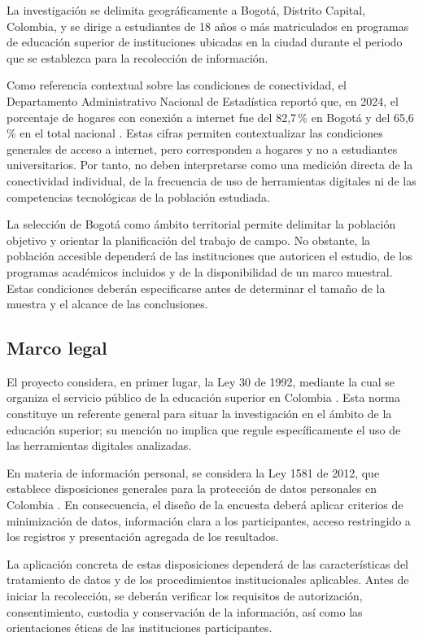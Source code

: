 La investigación se delimita geográficamente a Bogotá, Distrito Capital, Colombia, y se dirige a estudiantes de 18 años o más matriculados en programas de educación superior de instituciones ubicadas en la ciudad durante el periodo que se establezca para la recolección de información.

Como referencia contextual sobre las condiciones de conectividad, el Departamento Administrativo Nacional de Estadística reportó que, en 2024, el porcentaje de hogares con conexión a internet fue del 82,7\,\% en Bogotá y del 65,6\,\% en el total nacional \parencite{dane2025entic}. Estas cifras permiten contextualizar las condiciones generales de acceso a internet, pero corresponden a hogares y no a estudiantes universitarios. Por tanto, no deben interpretarse como una medición directa de la conectividad individual, de la frecuencia de uso de herramientas digitales ni de las competencias tecnológicas de la población estudiada.

La selección de Bogotá como ámbito territorial permite delimitar la población objetivo y orientar la planificación del trabajo de campo. No obstante, la población accesible dependerá de las instituciones que autoricen el estudio, de los programas académicos incluidos y de la disponibilidad de un marco muestral. Estas condiciones deberán especificarse antes de determinar el tamaño de la muestra y el alcance de las conclusiones.

\subsection{Marco legal}

El proyecto considera, en primer lugar, la Ley 30 de 1992, mediante la cual se organiza el servicio público de la educación superior en Colombia \parencite{colombia1992ley30}. Esta norma constituye un referente general para situar la investigación en el ámbito de la educación superior; su mención no implica que regule específicamente el uso de las herramientas digitales analizadas.

En materia de información personal, se considera la Ley 1581 de 2012, que establece disposiciones generales para la protección de datos personales en Colombia \parencite{colombia2012ley1581}. En consecuencia, el diseño de la encuesta deberá aplicar criterios de minimización de datos, información clara a los participantes, acceso restringido a los registros y presentación agregada de los resultados.

La aplicación concreta de estas disposiciones dependerá de las características del tratamiento de datos y de los procedimientos institucionales aplicables. Antes de iniciar la recolección, se deberán verificar los requisitos de autorización, consentimiento, custodia y conservación de la información, así como las orientaciones éticas de las instituciones participantes.

